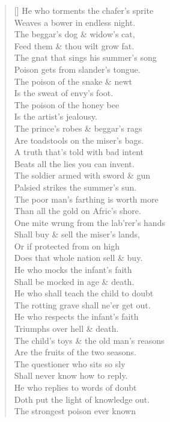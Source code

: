 \documentclass[MAIN]{subfiles}
\begin{document}
\begin{verse}[\versewidth]
He who torments the chafer's sprite\\
Weaves a bower in endless night.\\
The beggar's dog \& widow's cat,\\
Feed them \& thou wilt grow fat.\\
The gnat that sings his summer's song\\
Poison gets from slander's tongue.\\
The poison of the snake \& newt\\
Is the sweat of envy's foot.\\
The poison of the honey bee\\
Is the artist's jealousy.\\
The prince's robes \& beggar's rags\\
Are toadstools on the miser's bags.\\
A truth that's told with bad intent\\
Beats all the lies you can invent.\\
The soldier armed with sword \& gun\\
Palsied strikes the summer's sun.\\
The poor man's farthing is worth more\\
Than all the gold on Afric's shore.\\
One mite wrung from the lab'rer's hands\\
Shall buy \& sell the miser's lands,\\
Or if protected from on high\\
Does that whole nation sell \& buy.\\
He who mocks the infant's faith\\
Shall be mocked in age \& death.\\
He who shall teach the child to doubt\\
The rotting grave shall ne'er get out.\\
He who respects the infant's faith\\
Triumphs over hell \& death.\\
The child's toys \& the old man's reasons\\
Are the fruits of the two seasons.\\
The questioner who sits so sly\\
Shall never know how to reply.\\
He who replies to words of doubt\\
Doth put the light of knowledge out.\\
The strongest poison ever known\\

\end{verse}
\end{document}
